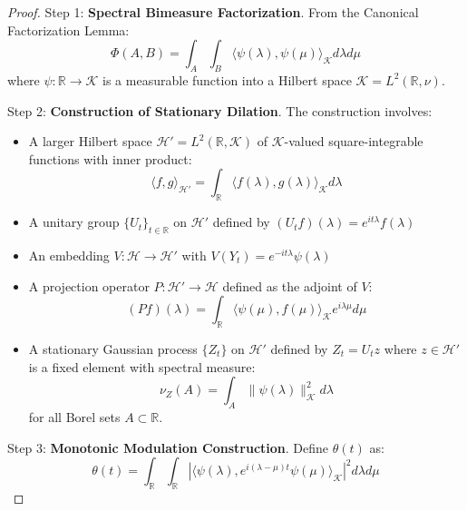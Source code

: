 \documentclass{article}
\theoremstyle{plain}
\theoremstyle{definition}
\begin{document}
\begin{proof}
Step 1: \textbf{Spectral Bimeasure Factorization}. From the Canonical Factorization Lemma:
\begin{equation}
\Phi(A,B) = \int_A \int_B \langle \psi(\lambda), \psi(\mu) \rangle_{\mathcal{K}} d\lambda d\mu
\end{equation}
where $\psi: \mathbb{R} \to \mathcal{K}$ is a measurable function into a Hilbert space $\mathcal{K} = L^2(\mathbb{R}, \nu)$.

Step 2: \textbf{Construction of Stationary Dilation}. The construction involves:
\begin{itemize}
\item A larger Hilbert space $\mathcal{H}' = L^2(\mathbb{R}, \mathcal{K})$ of $\mathcal{K}$-valued square-integrable functions with inner product:
\begin{equation}
\langle f, g \rangle_{\mathcal{H}'} = \int_{\mathbb{R}} \langle f(\lambda), g(\lambda) \rangle_{\mathcal{K}} d\lambda
\end{equation}
\item A unitary group $\{U_t\}_{t \in \mathbb{R}}$ on $\mathcal{H}'$ defined by $(U_t f)(\lambda) = e^{it\lambda}f(\lambda)$
\item An embedding $V: \mathcal{H} \to \mathcal{H}'$ with $V(Y_t) = e^{-it\lambda}\psi(\lambda)$
\item A projection operator $P: \mathcal{H}' \to \mathcal{H}$ defined as the adjoint of $V$:
\begin{equation}
(Pf)(\lambda) = \int_{\mathbb{R}} \langle \psi(\mu), f(\mu) \rangle_{\mathcal{K}} e^{i\lambda\mu} d\mu
\end{equation}
\item A stationary Gaussian process $\{Z_t\}$ on $\mathcal{H}'$ defined by $Z_t = U_t z$ where $z \in \mathcal{H}'$ is a fixed element with spectral measure:
\begin{equation}
\nu_Z(A) = \int_A \|\psi(\lambda)\|^2_{\mathcal{K}} d\lambda
\end{equation}
for all Borel sets $A \subset \mathbb{R}$.
\end{itemize}

Step 3: \textbf{Monotonic Modulation Construction}. Define $\theta(t)$ as:
\begin{equation}
\theta(t) = \int_{\mathbb{R}} \int_{\mathbb{R}} |\langle \psi(\lambda), e^{i(\lambda-\mu)t} \psi(\mu) \rangle_{\mathcal{K}}|^2 d\lambda d\mu
\end{equation}


\end{proof}
\end{document}
